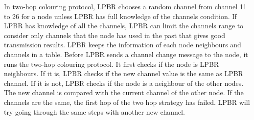 In two-hop colouring protocol, LPBR chooses a random channel from channel 11 to 26 for a node unless LPBR has full knowledge of the channels condition. If LPBR has knowledge of all the channels, LPBR can limit the channels range to consider only channels that the node has used in the past that gives good transmission results. LPBR keeps the information of each node neighbours and channels in a table. Before LPBR sends a channel change message to the node, it runs the two-hop colouring protocol. It first checks if the node is LPBR neighbours. If it is, LPBR checks if the new channel value is the same as LPBR channel. If it is not, LPBR checks if the node is a neighbour of the other nodes. The new channel is compared with the current channel of the other node. If the channels are the same, the first hop of the two hop strategy has failed. LPBR will try going through the same steps with another new channel.


